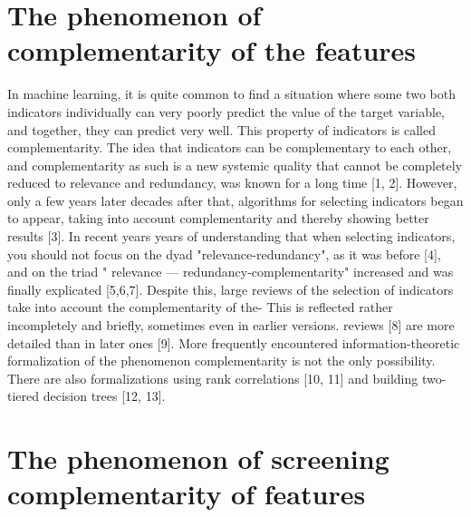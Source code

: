 \documentclass[12pt]{a&t}
\begin{document}
\section{The phenomenon of  complementarity of the features}

In machine learning, it is quite common to find a situation where some two
both indicators individually can very poorly predict the value of the target variable, and
together, they can predict very well. This property of indicators is called
complementarity. The idea that indicators can be complementary to each other, and
complementarity as such is a new systemic quality that cannot be completely reduced to
relevance and redundancy, was known for a long time [1, 2]. However, only a few years later
decades after that, algorithms for selecting indicators began to appear, taking into account
complementarity and thereby showing better results [3]. In recent years
years of understanding that when selecting indicators, you should not focus on the dyad
"relevance-redundancy", as it was before [4], and on the triad " relevance —
redundancy-complementarity" increased and was finally explicated [5,6,7].
Despite this, large reviews of the selection of indicators take into account the complementarity of the-
This is reflected rather incompletely and briefly, sometimes even in earlier versions.
reviews [8] are more detailed than in later ones [9].
More frequently encountered information-theoretic formalization of the phenomenon
complementarity is not the only possibility. There are also formalizations
using rank correlations [10, 11] and building two-tiered decision trees [12,
13].

\section{The phenomenon of screening complementarity of features}
\end{document}
